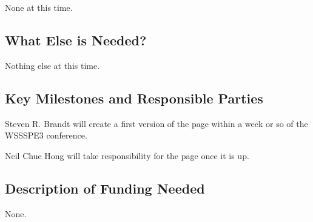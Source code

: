 None at this time.

\subsection{What Else is Needed?}

Nothing else at this time.

\subsection{Key Milestones and Responsible Parties}

Steven R. Brandt will create a first version of the page within a week or so of the WSSSPE3 conference.

Neil Chue Hong will take responsibility for the page once it is up.

\subsection{Description of Funding Needed}

None.

